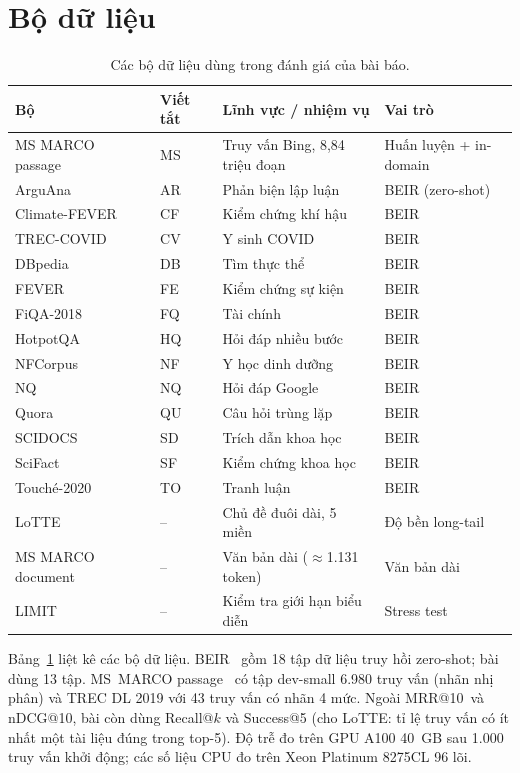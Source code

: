 \documentclass[a4paper,13pt]{extreport}
\makeatletter
\theoremstyle{plain}
\newcommand{\ndcg}{nDCG@10}
\newcommand{\mrr}{MRR@10}
\makeatother
\begin{document}
\section{Bộ dữ liệu}
\begin{table}[htbp]
\centering
\caption{Các bộ dữ liệu dùng trong đánh giá của bài báo.}
\label{tab:datasets-paper}
\small
\begin{tabular}{llll}
\toprule
\textbf{Bộ} & \textbf{Viết tắt} & \textbf{Lĩnh vực / nhiệm vụ} & \textbf{Vai trò}\\
\midrule
MS MARCO passage~\cite{nguyen2016} & MS & Truy vấn Bing, 8,84 triệu đoạn & Huấn luyện + in-domain\\
ArguAna~\cite{wachsmuth2018} & AR & Phản biện lập luận & BEIR (zero-shot)\\
Climate-FEVER~\cite{diggelmann2020} & CF & Kiểm chứng khí hậu & BEIR\\
TREC-COVID~\cite{voorhees2021} & CV & Y sinh COVID & BEIR\\
DBpedia~\cite{hasibi2017} & DB & Tìm thực thể & BEIR\\
FEVER~\cite{thorne2018} & FE & Kiểm chứng sự kiện & BEIR\\
FiQA-2018~\cite{maia2018} & FQ & Tài chính & BEIR\\
HotpotQA~\cite{yang2018} & HQ & Hỏi đáp nhiều bước & BEIR\\
NFCorpus~\cite{boteva2016} & NF & Y học dinh dưỡng & BEIR\\
NQ~\cite{kwiatkowski2019} & NQ & Hỏi đáp Google & BEIR\\
Quora & QU & Câu hỏi trùng lặp & BEIR\\
SCIDOCS~\cite{cohan2020} & SD & Trích dẫn khoa học & BEIR\\
SciFact~\cite{wadden2020} & SF & Kiểm chứng khoa học & BEIR\\
Touché-2020~\cite{bondarenko2020} & TO & Tranh luận & BEIR\\
LoTTE~\cite{santhanam2022b} & -- & Chủ đề đuôi dài, 5 miền & Độ bền long-tail\\
MS MARCO document~\cite{nguyen2016} & -- & Văn bản dài ($\approx$1.131 token) & Văn bản dài\\
LIMIT~\cite{weller2025} & -- & Kiểm tra giới hạn biểu diễn & Stress test\\
\bottomrule
\end{tabular}
\end{table}
Bảng~\ref{tab:datasets-paper} liệt kê các bộ dữ liệu. BEIR~\cite{thakur2021} gồm 18 tập dữ liệu truy hồi zero-shot; bài dùng 13 tập. MS~MARCO passage~\cite{nguyen2016} có tập dev-small 6.980 truy vấn (nhãn nhị phân) và TREC DL 2019 với 43 truy vấn có nhãn 4 mức. Ngoài \mrr\ và \ndcg, bài còn dùng Recall@$k$ và Success@5 (cho LoTTE: tỉ lệ truy vấn có ít nhất một tài liệu đúng trong top-5). Độ trễ đo trên GPU A100 40~GB sau 1.000 truy vấn khởi động; các số liệu CPU đo trên Xeon Platinum 8275CL 96 lõi.
\end{document}
